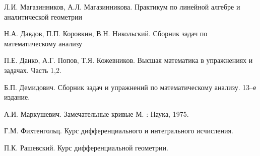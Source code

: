 \newpage

\begin{thebibliography}{99}
    
     Л.И. Магазинников, А.Л. Магазинникова. Практикум по линейной алгебре и аналитической геометрии
    
     Н.А. Давдов, П.П. Коровкин, В.Н. Никольский. Сборник задач по математическому анализу
    
     П.Е. Данко, А.Г. Попов, Т.Я. Кожевников. Высшая математика в упражнениях и задачах. Часть 1,2.
    
     Б.П. Демидович. Сборник задач и упражнений по математическому анализу. 13--е издание.
    
     А.И. Маркушевич. Замечательные кривые М. : Наука, 1975.
    
     Г.М. Фихтенгольц. Курс дифференциального и интегрального исчисления.
    
     П.К. Рашевский. Курс дифференциальной геометрии.
    
\end{thebibliography}